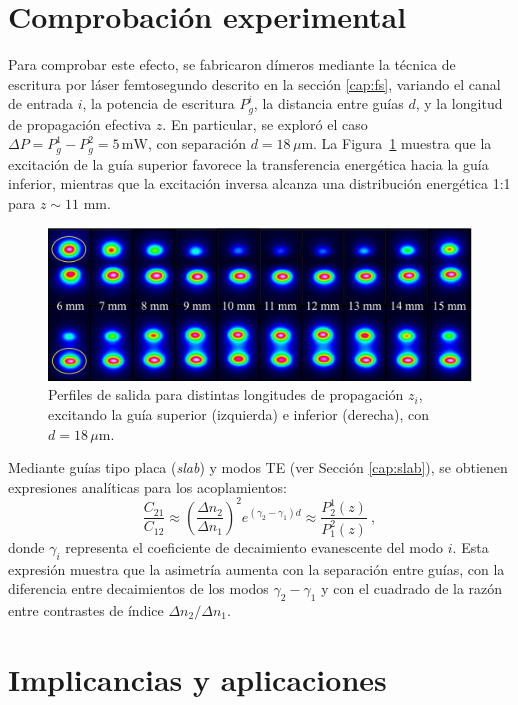 \section{Comprobación experimental}
Para comprobar este efecto, se fabricaron dímeros mediante la técnica de escritura por láser femtosegundo descrito en la sección \ref{cap:fs}, variando el canal de entrada \( i \), la potencia de escritura \( P_{g}^i \), la distancia entre guías \( d \), y la longitud de propagación efectiva \( z \). En particular, se exploró el caso \( \Delta P = P_g^1 - P_g^2 = 5\,\mathrm{mW} \), con separación \( d = 18\,\mu\mathrm{m} \). La Figura~\ref{fig:nosymexp} muestra que la excitación de la guía superior favorece la transferencia energética hacia la guía inferior, mientras que la excitación inversa alcanza una distribución energética 1:1 para $z\sim 11$ mm.
\begin{figure}[H]
	\centering
	\includegraphics[width=0.9\linewidth]{media/nonsymm-exp.png}
	\caption[Perfiles de salida para distintas longitudes de propagación.]{Perfiles de salida para distintas longitudes de propagación \( z_i \), excitando la guía superior (izquierda) e inferior (derecha), con \( d = 18\,\mu\mathrm{m} \). \label{fig:nosymexp}}
\end{figure} \vspace{-4ex} Mediante guías tipo placa (\textit{slab}) y modos TE (ver Sección \ref{cap:slab}), se obtienen expresiones analíticas para los acoplamientos:
\begin{equation*}
	\frac{C_{21}}{C_{12}} \approx \left( \frac{\Delta n_2}{\Delta n_1} \right)^2 e^{(\gamma_2 - \gamma_1) d}\approx \frac{P_2^1(z)}{P_1^2(z)} \ ,
\end{equation*}
donde \( \gamma_i \) representa el coeficiente de decaimiento evanescente del modo \( i \). Esta expresión muestra que la asimetría aumenta con la separación entre guías, con la diferencia entre decaimientos de los modos $\gamma_2 - \gamma_1$ y con el cuadrado de la razón entre contrastes de índice $\Delta n_2/\Delta n_1$. 

\section{Implicancias y aplicaciones}

